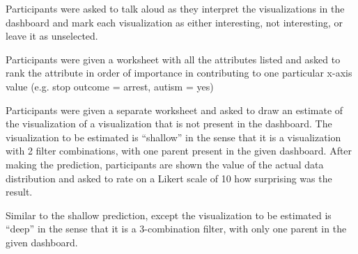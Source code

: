  Participants were asked to talk aloud as they interpret the visualizations in the dashboard and mark each visualization as either interesting, not interesting, or leave it as unselected.

 Participants were given a worksheet with all the attributes listed and asked to rank the attribute in order of importance in contributing to one particular x-axis value (e.g. stop outcome = arrest, autism = yes)

 Participants were given a separate worksheet and asked to draw an estimate of the visualization of a visualization that is not present in the dashboard. The visualization to be estimated is ``shallow'' in the sense that it is a visualization with 2 filter combinations, with one parent present in the given dashboard. After making the prediction, participants are shown the value of the actual data distribution and asked to rate on a Likert scale of 10 how surprising was the result.

 Similar to the shallow prediction, except the visualization to be estimated is ``deep'' in the sense that it is a 3-combination filter, with only one parent in the given dashboard. 

